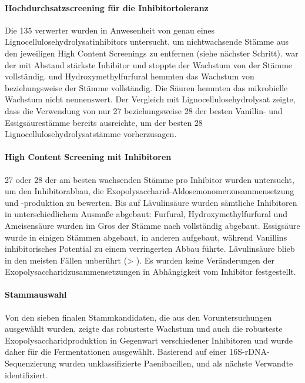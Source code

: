 \paragraph{Hochdurchsatzscreening für die Inhibitortoleranz}
Die 135 \XYL{}verwerter wurden in Anwesenheit von  genau eines Lignocellulosehydrolysatinhibitors untersucht, um nichtwachsende Stämme aus den jeweiligen High Content Screenings zu entfernen (siehe nächster Schritt). \VAN{} war der mit Abstand stärkste Inhibitor und stoppte der Wachstum von  der Stämme vollständig. \FUR{} und Hydroxymethylfurfural hemmten das Wachstum von  beziehungsweise  der Stämme vollständig. Die Säuren hemmten das mikrobielle Wachstum nicht nennenswert. Der Vergleich mit Lignocellulosehydrolysat zeigte, dass die Verwendung von nur 27 beziehungsweise 28 der besten Vanillin- und Essigsäurestämme bereits ausreichte, um  der besten 28 Lignocellulosehydrolysatstämme vorherzusagen.

\paragraph{High Content Screening mit Inhibitoren}
27 oder 28 der am besten wachsenden Stämme pro Inhibitor wurden untersucht, um den Inhibitorabbau, die Exopoly\-saccharid-Aldose\-monomer\-zusammen\-setzung und -produktion zu bewerten. Bis auf Lävulinsäure wurden sämtliche Inhibitoren in unterschiedlichem Ausmaße abgebaut: Furfural, Hydroxymethylfurfural und Ameisensäure wurden im Gros der Stämme nach  vollständig abgebaut. Essigsäure wurde in einigen Stämmen abgebaut, in anderen aufgebaut, während Vanillins inhibitorisches Potential zu einem verringerten Abbau führte. Lävulinsäure blieb in den meisten Fällen unberührt (> ). Es wurden keine Veränderungen der Exopolysaccharidzusammensetzungen in Abhängigkeit vom Inhibitor  festgestellt.

\paragraph{Stammauswahl}
Von den sieben finalen Stammkandidaten, die aus den Voruntersuchungen ausgewählt wurden, zeigte \strain{} das robusteste Wachstum und auch die robusteste Exopolysaccharidproduktion in Gegenwart verschiedener Inhibitoren und wurde daher für die Fermentationen ausgewählt. Basierend auf einer 16S-rDNA-Sequenzierung wurden unklassifizierte Paenibacillen,  und  als nächste Verwandte identifiziert.


